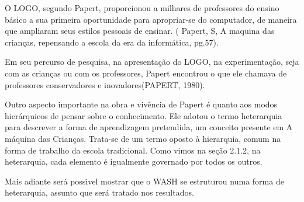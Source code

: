\documentclass[
12pt,		%
openright,	%
twoside,  %
a4paper,			%
chapter=TITLE,		%
english,			%
french,				%
spanish,			%
brazil				%
]{USPSC-classe/USPSC}
\begin{document}
O LOGO, segundo Papert, proporcionou a milhares de professores do ensino b\'asico a sua primeira oportunidade para apropriar-se do computador, de maneira que ampliaram seus estilos pessoais de ensinar. ( Papert, S, \textquotedbl A maquina das crian\c{c}as, repensando a escola da era da inform\'atica\textquotedbl , pg.57).

















Em seu percurso de pesquisa, na apresenta\c{c}\~ao do LOGO, na experimenta\c{c}\~ao, seja com as crian\c{c}as ou com os professores, Papert encontrou o que ele chamava de \textquotedbl professores conservadores e  inovadores\textquotedbl  (PAPERT, 1980).

















Outro aspecto importante na obra e viv\^encia de Papert \'e quanto aos modos hier\'arquicos de pensar sobre o conhecimento. Ele adotou o termo  \textquotedbl  heterarquia \textquotedbl  para descrever a forma de aprendizagem pretendida, um conceito presente em  \textquotedbl A m\'aquina das Crian\c{c}as\textquotedbl . Trata-se de  um termo oposto \`a hierarquia, comum na forma de trabalho da escola tradicional. Como vimos na se\c{c}\~ao 2.1.2, na heterarquia, cada elemento \'e igualmente governado por todos os outros.

















Mais adiante ser\'a poss\'{\i}vel mostrar que o WASH se estruturou numa forma de heterarquia, assunto que ser\'a tratado nos resultados.
\end{document}
